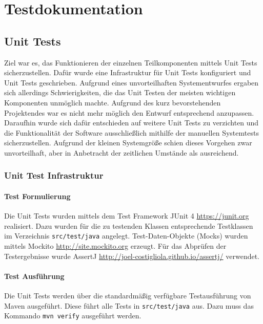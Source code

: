
\section{Testdokumentation}

\subsection{Unit Tests}
Ziel war es, das Funktionieren der einzelnen Teilkomponenten mittels Unit Tests sicherzustellen. Dafür wurde eine Infrastruktur für Unit Tests konfiguriert und Unit Tests geschrieben. Aufgrund eines unvorteilhaften Systementwurfes ergaben sich allerdings Schwierigkeiten, die das Unit Testen der meisten wichtigen Komponenten unmöglich machte. Aufgrund des kurz bevorstehenden Projektendes war es nicht mehr möglich den Entwurf entsprechend anzupassen. Daraufhin wurde sich dafür entschieden auf weitere Unit Tests zu verzichten und die Funktionalität der Software ausschließlich mithilfe der manuellen Systemtests sicherzustellen. Aufgrund der kleinen Systemgröße schien dieses Vorgehen zwar unvorteilhaft, aber in Anbetracht der zeitlichen Umstände als ausreichend.

\subsubsection{Unit Test Infrastruktur}
\paragraph{Test Formulierung}
Die Unit Tests wurden mittels dem Test Framework JUnit 4 \href{https://junit.org}{https://junit.org} realisiert. Dazu wurden für die zu testenden Klassen entsprechende Testklassen im Verzeichnis \texttt{src/test/java} angelegt. Test-Daten-Objekte (Mocks) wurden mittels Mockito \href{http://site.mockito.org}{http://site.mockito.org} erzeugt. Für das Abprüfen der Testergebnisse wurde AssertJ \href{http://joel-costigliola.github.io/assertj/}{http://joel-costigliola.github.io/assertj/} verwendet.
\paragraph{Test Ausführung}
Die Unit Tests werden über die standardmäßig verfügbare Testausführung von Maven ausgeführt. Diese führt alle Tests in \texttt{src/test/java} aus. Dazu muss das Kommando \texttt{mvn verify} ausgeführt werden.

